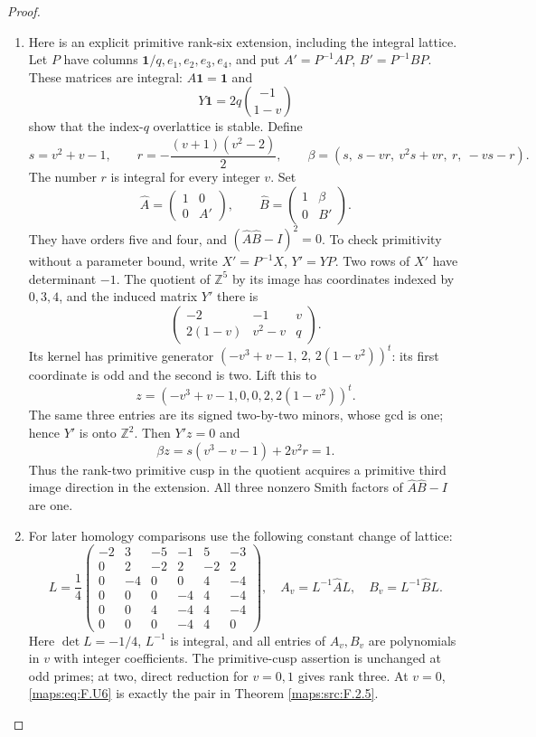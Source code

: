 \documentclass[11pt,a4paper]{article}
\theoremstyle{definition}
\begin{document}
\begin{proof}
\begin{enumerate}[label=\arabic*.]
\item Here is an explicit primitive rank-six extension, including
the integral lattice.  Let $P$ have columns
$\mathbf1/q,e_1,e_2,e_3,e_4$, and put
$A'=P^{-1}AP$, $B'=P^{-1}BP$.  These matrices are integral:
$A\mathbf1=\mathbf1$ and
\[
 Y\mathbf1=2q\binom{-1}{1-v}
\]
show that the index-$q$ overlattice is stable.  Define
\[
 s=v^2+v-1,\qquad r=-\frac{(v+1)(v^2-2)}2,
 \qquad
 \beta=(s,\ s-vr,\ v^2s+vr,\ r,\ -vs-r).
 \tag{F.U3}\label{maps:eq:F.U3}
\]
The number $r$ is integral for every integer $v$.
Set
\[
 \widehat A=\begin{pmatrix}1&0\\0&A'\end{pmatrix},
 \qquad
 \widehat B=\begin{pmatrix}1&\beta\\0&B'\end{pmatrix}.
 \tag{F.U4}\label{maps:eq:F.U4}
\]
They have orders five and four, and
$(\widehat A\widehat B-I)^2=0$.
To check primitivity without a parameter bound, write
$X'=P^{-1}X$, $Y'=YP$.  Two rows of $X'$ have determinant
$-1$.  The quotient of $\mathbb Z^5$ by its image has
coordinates indexed by $0,3,4$, and the induced matrix $Y'$
there is
\[
 \begin{pmatrix}-2&-1&v\\2(1-v)&v^2-v&q\end{pmatrix}.
\]
Its kernel has primitive generator
$(-v^3+v-1,\,2,\,2(1-v^2))^t$: its first coordinate is
odd and the second is two.  Lift this to
\[
 z=(-v^3+v-1,0,0,2,2(1-v^2))^t.
\]
The same three entries are its signed two-by-two minors,
whose gcd is one; hence $Y'$ is onto $\mathbb Z^2$.
Then $Y'z=0$ and
\[
 \beta z=s(v^3-v-1)+2v^2r=1.
 \tag{F.U5}\label{maps:eq:F.U5}
\]
Thus the rank-two primitive cusp in the quotient acquires a
primitive third image direction in the extension.  All three
nonzero Smith factors of $\widehat A\widehat B-I$ are one.

\item For later homology comparisons use the following constant
change of lattice:
\[
 L=\frac14\begin{pmatrix}
 -2&3&-5&-1&5&-3\\
 0&2&-2&2&-2&2\\
 0&-4&0&0&4&-4\\
 0&0&0&-4&4&-4\\
 0&0&4&-4&4&-4\\
 0&0&0&-4&4&0
 \end{pmatrix},\quad
 A_v=L^{-1}\widehat A L,\quad B_v=L^{-1}\widehat B L.
 \tag{F.U6}\label{maps:eq:F.U6}
\]
Here $\det L=-1/4$, $L^{-1}$ is integral, and all entries of
$A_v,B_v$ are polynomials in $v$ with integer coefficients.
The primitive-cusp assertion is unchanged at odd primes;
at two, direct reduction for $v=0,1$ gives rank three.
At $v=0$, \eqref{maps:eq:F.U6} is exactly the pair in Theorem \ref{maps:src:F.2.5}.


\end{enumerate}
\end{proof}
\end{document}

